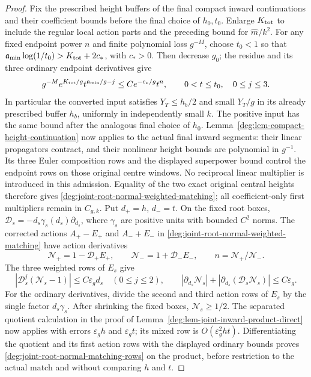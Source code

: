 \begin{proof}
Fix the prescribed height buffers of the final compact inward
continuations and their coefficient bounds before the final choice
of \(h_0,t_0\). Enlarge \(K_{\rm tot}\) to include the regular
local action parts and the preceding bound for \(\widehat m/k^2\).
For any fixed endpoint power \(n\) and finite polynomial loss
\(g^{-M}\), choose \(t_0<1\) so that
\(\mathfrak a_{\min}\log(1/t_0)>K_{\rm tot}+2c_*\), with
\(c_*>0\). Then decrease \(g_0\); the residue and its three
ordinary endpoint derivatives give
\[
 g^{-M}e^{K_{\rm tot}/g}t^{\mathfrak a_{\min}/g-j}
 \le Ce^{-c_*/g}t^n,\qquad 0<t\le t_0,\quad 0\le j\le3.
\]
In particular the converted input satisfies \(Y_T\le h_b/2\)
and small \(Y_T/g\) in its already prescribed buffer \(h_b\),
uniformly in independently small \(k\). The positive input has
the same bound after the analogous final choice of \(h_0\).
Lemma~\ref{deg:lem-compact-height-continuation} now applies to the
actual final inward segments: their linear propagators contract,
and their nonlinear height bounds are polynomial in \(g^{-1}\).
Its three Euler composition rows and the displayed superpower
bound control the endpoint rows on those original centre windows.
No reciprocal linear multiplier is introduced in this admission.
Equality of the two exact original central heights therefore gives
\eqref{deg:joint-root-normal-weighted-matching}; all coefficient-only
first multipliers remain in \(C_{g,k}\).
Put \(d_+=h\), \(d_-=t\). On the fixed root boxes,
\(\mathcal D_s=-d_s\gamma_s(d_s)\partial_{d_s}\), where
\(\gamma_s\) are positive units with bounded \(C^2\) norms.
The corrected actions \(A_+-E_+\) and \(A_-+E_-\) in
\eqref{deg:joint-root-normal-weighted-matching} have action derivatives
\[
 \mathcal N_+=1-\mathcal D_+E_+,
 \qquad \mathcal N_-=1+\mathcal D_-E_-,
 \qquad n=\mathcal N_+/\mathcal N_- .
\]
The three weighted rows of \(E_s\) give
\[
 |\mathcal D_s^j(\mathcal N_s-1)|
     \le C\varepsilon_gd_s\quad(0\le j\le2),\qquad
 |\partial_{d_s}\mathcal N_s|
  +|\partial_{d_s}(\mathcal D_s\mathcal N_s)|
     \le C\varepsilon_g .
\]
For the ordinary derivatives, divide the second and third action
rows of \(E_s\) by the single factor \(d_s\gamma_s\).
After shrinking the fixed boxes, \(\mathcal N_s\ge1/2\).
The separated quotient calculation in the proof of
Lemma~\ref{deg:lem-joint-inward-product-direct} now applies with
errors \(\varepsilon_gh\) and \(\varepsilon_gt\); its mixed row is
\(O(\varepsilon_g^2ht)\). Differentiating the quotient and its first
action rows with the displayed ordinary bounds proves
\eqref{deg:joint-root-normal-matching-rows} on the product, before
restriction to the actual match and without comparing \(h\) and \(t\).


\end{proof}
